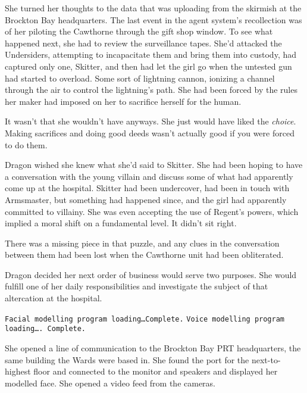 She turned her thoughts to the data that was uploading from the skirmish at the Brockton Bay headquarters.  The last event in the agent system's recollection was of her piloting the Cawthorne through the gift shop window.  To see what happened next, she had to review the surveillance tapes.  She'd attacked the Undersiders, attempting to incapacitate them and bring them into custody, had captured only one, Skitter, and then had let the girl go when the untested gun had started to overload.  Some sort of lightning cannon, ionizing a channel through the air to control the lightning's path.  She had been forced by the rules her maker had imposed on her to sacrifice herself for the human.



It wasn't that she wouldn't have anyways.  She just would have liked the \emph{choice}.  Making sacrifices and doing good deeds wasn't actually good if you were forced to do them.



Dragon wished she knew what she'd said to Skitter.  She had been hoping to have a conversation with the young villain and discuss some of what had apparently come up at the hospital.  Skitter had been undercover, had been in touch with Armsmaster, but something had happened since, and the girl had apparently committed to villainy.  She was even accepting the use of Regent's powers, which implied a moral shift on a fundamental level.  It didn't sit right.



There was a missing piece in that puzzle, and any clues in the conversation between them had been lost when the Cawthorne unit had been obliterated.



Dragon decided her next order of business would serve two purposes.  She would fulfill one of her daily responsibilities and investigate the subject of that altercation at the hospital.



\texttt{Facial modelling program loading\ldots Complete.}\linebreak
\texttt{Voice modelling program loading\ldots. Complete.}


She opened a line of communication to the Brockton Bay PRT headquarters, the same building the Wards were based in.  She found the port for the next-to-highest floor and connected to the monitor and speakers and displayed her modelled face.  She opened a video feed from the cameras.



